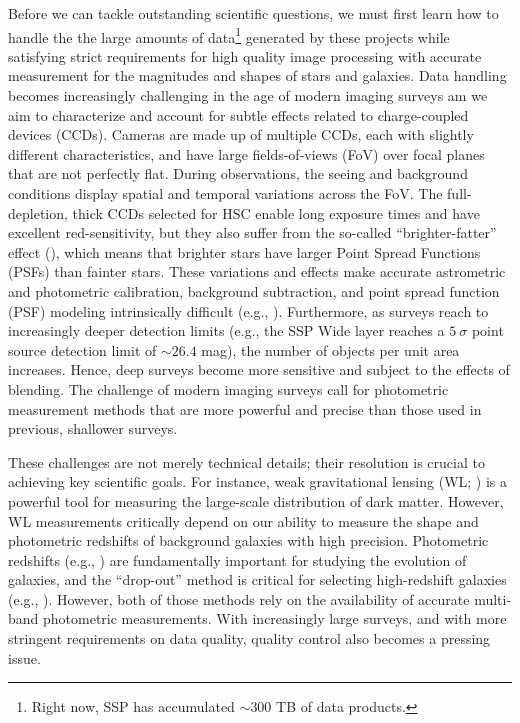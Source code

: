 \documentclass[useamsfonts]{pasj01}
\begin{document}
    Before we can tackle outstanding scientific questions, we must first learn
    how to handle the the large amounts of data\footnote{Right now, SSP has 
    accumulated ${\sim}300$ TB of data products.} generated by these projects while 
    satisfying strict requirements for high quality image processing with accurate 
    measurement for the magnitudes and shapes of stars and galaxies. 
    Data handling becomes increasingly challenging in the age of modern imaging
    surveys am we aim to characterize and account for subtle effects related to 
    charge-coupled devices (CCDs). 
    Cameras are made up of multiple CCDs, each with slightly different
    characteristics, and have large fields-of-views (FoV) over focal planes that 
    are not perfectly flat. 
    During observations, the seeing and background conditions display spatial and 
    temporal variations across the FoV. 
    The full-depletion, thick CCDs selected for HSC enable long exposure
    times and have excellent red-sensitivity, but they also suffer from the
    so-called ``brighter-fatter'' effect (\citealt{Antilogus2014}), which means that
    brighter stars have larger Point Spread Functions (PSFs) than fainter stars. 
    These variations and effects make accurate astrometric and photometric calibration,
    background subtraction, and point spread function (PSF) modeling intrinsically
    difficult (e.g., \citealt{Schlafly2012}). 
    Furthermore, as surveys reach to increasingly deeper detection limits
    (e.g., the SSP Wide layer reaches a $5\ \sigma$ point source detection limit of
    ${\sim}26.4$ mag), the number of objects per unit area increases.  
    Hence, deep surveys become more sensitive and subject to the effects of blending.  
    The challenge of modern imaging surveys call for  photometric measurement methods
    that are more powerful and precise than those used in previous, shallower surveys.
    
    These challenges are not merely technical details; their resolution is crucial
    to achieving key scientific goals.
    For instance, weak gravitational lensing (WL; \citealt{Kaiser1993, Bartelmann2001})
    is a powerful tool for measuring the large-scale distribution of dark matter.
    However, WL measurements critically depend on our ability to measure the shape and 
    photometric redshifts of background galaxies with high precision. 
    Photometric redshifts (e.g., \citealt{Benitez2000, Bolzonella2000, Ilbert2009}) are 
    fundamentally important for studying the evolution of galaxies, and the ``drop-out'' 
    method is critical for selecting high-redshift galaxies 
    (e.g., \citealt{Steidel1996}).
    However, both of those methods rely on the availability of accurate multi-band 
    photometric measurements. 
    With increasingly large surveys, and with more stringent requirements on data 
    quality, quality control also becomes a pressing issue. 
    
\end{document}
